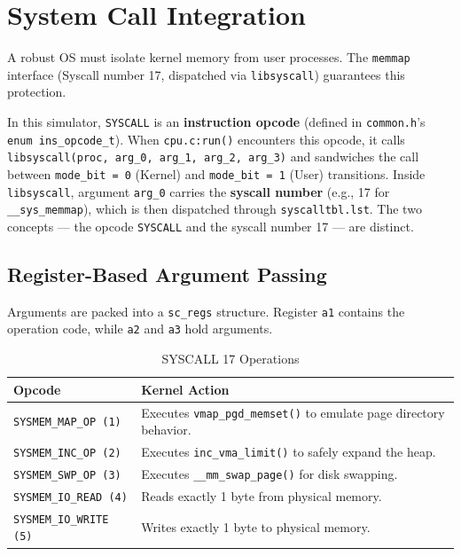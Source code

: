 \section{System Call Integration}
A robust OS must isolate kernel memory from user processes. The \texttt{memmap} interface (Syscall number 17, dispatched via \texttt{libsyscall}) guarantees this protection.

\begin{infobox}
In this simulator, \texttt{SYSCALL} is an \textbf{instruction opcode} (defined in \texttt{common.h}'s \texttt{enum ins\_opcode\_t}). When \texttt{cpu.c:run()} encounters this opcode, it calls \texttt{libsyscall(proc, arg\_0, arg\_1, arg\_2, arg\_3)} and sandwiches the call between \texttt{mode\_bit = 0} (Kernel) and \texttt{mode\_bit = 1} (User) transitions. Inside \texttt{libsyscall}, argument \texttt{arg\_0} carries the \textbf{syscall number} (e.g., 17 for \texttt{\_\_sys\_memmap}), which is then dispatched through \texttt{syscalltbl.lst}. The two concepts --- the opcode \texttt{SYSCALL} and the syscall number 17 --- are distinct.
\end{infobox}

\subsection{Register-Based Argument Passing}
Arguments are packed into a \texttt{sc\_regs} structure. Register \texttt{a1} contains the operation code, while \texttt{a2} and \texttt{a3} hold arguments.

\vspace{0.5em}
\begin{table}[H]
    \centering
    \renewcommand{\arraystretch}{1.2}
    \begin{tabular}{|l|p{8cm}|}
    \hline
    \textbf{Opcode} & \textbf{Kernel Action} \\
    \hline
    \texttt{SYSMEM\_MAP\_OP (1)} & Executes \texttt{vmap\_pgd\_memset()} to emulate page directory behavior. \\
    \texttt{SYSMEM\_INC\_OP (2)} & Executes \texttt{inc\_vma\_limit()} to safely expand the heap. \\
    \texttt{SYSMEM\_SWP\_OP (3)} & Executes \texttt{\_\_mm\_swap\_page()} for disk swapping. \\
    \texttt{SYSMEM\_IO\_READ (4)} & Reads exactly 1 byte from physical memory. \\
    \texttt{SYSMEM\_IO\_WRITE (5)} & Writes exactly 1 byte to physical memory. \\
    \hline
    \end{tabular}
    \caption{SYSCALL 17 Operations}
\end{table}
\vspace{0.5em}

